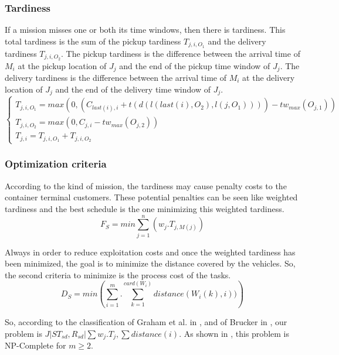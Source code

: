 \documentclass[a4paper,10pt]{article}
\begin{document}
\subsubsection{Tardiness}
If a mission misses one or both its time windows, then there is tardiness. This total tardiness is the sum of the pickup tardiness $T_{j,i,O_1}$ and the delivery tardiness $T_{j,i,O_2}$. The pickup tardiness is the difference between the arrival time of $M_i$ at the pickup location of $J_j$ and the end of the pickup time window of $J_j$. The delivery tardiness is the difference between the arrival time of $M_i$ at the delivery location of $J_j$ and the end of the delivery time window of $J_j$.
\begin{equation*}
 \begin{cases}
    T_{j,i,O_1} = max(0 , (C_{last(i),i} + t(d(l(last(i),O_2) , l(j, O_1)))) - tw_{max}(O_{j,1}))\\
    T_{j,i,O_2} = max(0 ,C_{j,i} - tw_{max}(O_{j,2}))\\
    T_{j,i} = T_{j,i,O_1} + T_{j,i,O_2}
\end{cases}
\end{equation*}

\subsubsection{Optimization criteria}

According to the kind of mission, the tardiness may cause penalty costs to the container terminal customers. These potential penalties can be seen like weighted tardiness and the best schedule is the one minimizing this weighted tardiness.
\begin{equation*}
    F_S = min \sum_{j=1}^{n}(w_j.T_{j,M(j)})
\end{equation*}

Always in order to reduce exploitation costs and once the weighted tardiness has been minimized, the goal is to minimize the distance covered by the vehicles. So, the second criteria to minimize is the process cost of the tasks.
\begin{equation*}
    D_S = min \left(\sum_{i=1}^{m}.\sum_{k=1}^{card(W_i)} distance(W_i(k), i))\right)
\end{equation*}


So, according to the classification of Graham et al. in \cite{Graham1979}, and of Brucker in \cite{Brucker2010}, our problem is ${ J|ST_{sd}, R_{sd}|\sum w_j.T_{j} , \sum distance(i)}$. As shown in \cite{Garey1976}, this problem is NP-Complete for $m\geq2$.
\end{document}
